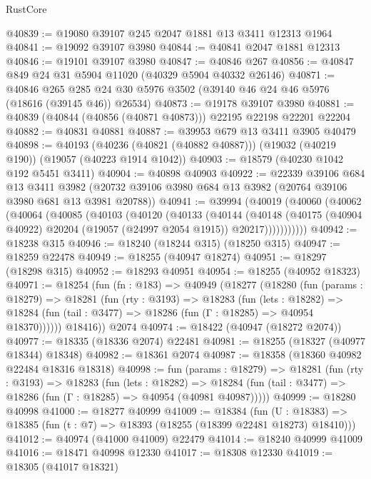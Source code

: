 \begin{lexlean}{RustCore}
\begin{coremodule}
@40839 := @19080 @39107 @245 @2047 @1881 @13 @3411 @12313 @1964
@40841 := @19092 @39107 @3980
@40844 := @40841 @2047 @1881 @12313
@40846 := @19101 @39107 @3980
@40847 := @40846 @267
@40856 := @40847 @849 @24 @31 @5904 @11020 (@40329 @5904 @40332 @26146)
@40871 := @40846
    @265
    @285
    @24
    @30
    @5976
    @3502
    (@39140 @46 @24 @46 @5976 (@18616 (@39145 @46)) @26534)
@40873 := @19178 @39107 @3980
@40881 := @40839 (@40844 (@40856 (@40871 @40873))) @22195 @22198 @22201 @22204
@40882 := @40831 @40881
@40887 := @39953 @679 @13 @3411 @3905 @40479
@40898 := @40193
    (@40236 (@40821 (@40882 @40887)))
    (@19032 (@40219 @190))
    (@19057 (@40223 @1914 @1042))
@40903 := @18579 (@40230 @1042 @192 @5451 @3411)
@40904 := @40898 @40903
@40922 := @22339
    @39106
    @684
    @13
    @3411
    @3982
    (@20732 @39106 @3980 @684 @13 @3982 (@20764 @39106 @3980 @681 @13 @3981 @20788))
@40941 := @39994
    (@40019
      (@40060
        (@40062
          (@40064
            (@40085
              (@40103
                (@40120
                  (@40133
                    (@40144
                      (@40148
                        (@40175
                          (@40904 @40922)
                          @20204
                          (@19057 (@24997 @2054 @1915))
                          @20217)))))))))))
@40942 := @18238 @315
@40946 := @18240 (@18244 @315) (@18250 @315)
@40947 := @18259 @22478
@40949 := @18255 (@40947 @18274)
@40951 := @18297 (@18298 @315)
@40952 := @18293 @40951
@40954 := @18255 (@40952 @18323)
@40971 := @18254
    (fun (fn : @183) =>
    @40949
      (@18277
        (@18280
          (fun (params : @18279) =>
          @18281
            (fun (rty : @3193) =>
            @18283
              (fun (lets : @18282) =>
              @18284 (fun (tail : @3477) => @18286 (fun (Γ : @18285) => @40954 @18370))))))
        @18416))
    @2074
@40974 := @18422 (@40947 (@18272 @2074))
@40977 := @18335 (@18336 @2074) @22481
@40981 := @18255 (@18327 (@40977 @18344) @18348)
@40982 := @18361 @2074
@40987 := @18358 (@18360 @40982 @22484 @18316 @18318)
@40998 := fun (params : @18279) =>
  @18281
    (fun (rty : @3193) =>
    @18283
      (fun (lets : @18282) =>
      @18284 (fun (tail : @3477) => @18286 (fun (Γ : @18285) => @40954 (@40981 @40987)))))
@40999 := @18280 @40998
@41000 := @18277 @40999
@41009 := @18384
    (fun (U : @18383) => @18385 (fun (t : @7) => @18393 (@18255 (@18399 @22481 @18273) @18410)))
@41012 := @40974 (@41000 @41009) @22479
@41014 := @18240 @40999 @41009
@41016 := @18471 @40998 @12330
@41017 := @18308 @12330
@41019 := @18305 (@41017 @18321)

\end{coremodule}
\end{lexlean}

